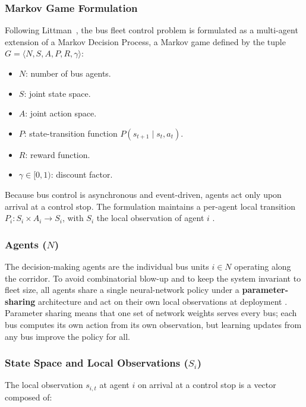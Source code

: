 \subsubsection{Markov Game Formulation}

Following Littman~\cite{Littman1994}, the bus fleet control problem is formulated as a multi-agent extension of a Markov Decision Process, a Markov game defined by the tuple $G = \langle N, S, A, P, R, \gamma \rangle$:

\begin{itemize}
\item $N$: number of bus agents.
\item $S$: joint state space.
\item $A$: joint action space.
\item $P$: state-transition function $P(s_{t+1}\mid s_t, a_t)$.
\item $R$: reward function.
\item $\gamma \in [0, 1)$: discount factor.
\end{itemize}

Because bus control is asynchronous and event-driven, agents act only upon arrival at a control stop. The formulation maintains a per-agent local transition $P_i : S_i \times A_i \rightarrow S_i$, with $S_i$ the local observation of agent $i$ \cite{Wangsun,Rodriguez2023Cooperative}.

\subsubsection{Agents ($N$)}

The decision-making agents are the individual bus units $i \in N$ operating along the corridor. To avoid combinatorial blow-up and to keep the system invariant to fleet size, all agents share a single neural-network policy under a \textbf{parameter-sharing} architecture and act on their own local observations at deployment \cite{Wangsun,Rodriguez2023Cooperative,Christianos2021PS}. Parameter sharing means that one set of network weights serves every bus; each bus computes its own action from its own observation, but learning updates from any bus improve the policy for all.

\subsubsection{State Space and Local Observations ($S_i$)}
\label{subsec:state-space}

The local observation $s_{i,t}$ at agent $i$ on arrival at a control stop is a vector composed of:

